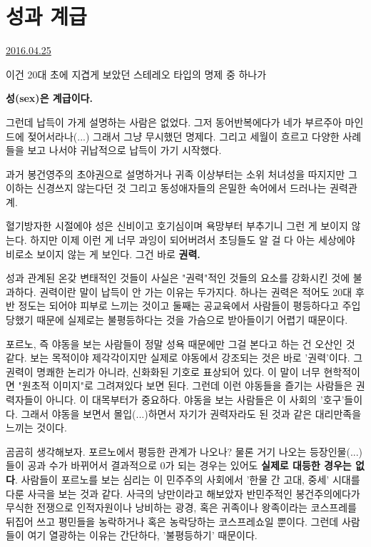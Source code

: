 \section{성과 계급}
\href{https://www.kockoc.com/Apoc/746405}{2016.04.25}

\vspace{5mm}

이건 20대 초에 지겹게 보았던 스테레오 타입의 명제 중 하나가
\vspace{5mm}

\textbf{성(sex)은 계급이다.}
\vspace{5mm}

그런데 납득이 가게 설명하는 사람은 없었다. 그저 동어반복에다가 네가 부르주아 마인드에 젖어서라나(...) 그래서 그냥 무시했던 명제다.
그리고 세월이 흐르고 다양한 사례들을 보고 나서야 귀납적으로 납득이 가기 시작했다.
\vspace{5mm}

과거 봉건영주의 초야권으로 설명하거나
귀족 이상부터는 소위 처녀성을 따지지만 그 이하는 신경쓰지 않는다던 것
그리고 동성애자들의 은밀한 속어에서 드러나는 권력관계.
\vspace{5mm}

혈기방자한 시절에야 성은 신비이고 호기심이며 욕망부터 부추기니 그런 게 보이지 않는다.
하지만 이제 이런 게 너무 과잉이 되어버려서 초딩들도 알 걸 다 아는 세상에야 비로소 보이지 않는 게 보인다.
그건 바로 \textbf{권력.}
\vspace{5mm}

성과 관계된 온갖 변태적인 것들이 사실은 "권력"적인 것들의 요소를 강화시킨 것에 불과하다.
권력이란 말이 납득이 안 가는 이유는 두가지다.
하나는 권력은 적어도 20대 후반 정도는 되어야 피부로 느끼는 것이고
둘째는 공교육에서 사람들이 평등하다고 주입당했기 때문에 실제로는 불평등하다는 것을 가슴으로 받아들이기 어렵기 때문이다.
\vspace{5mm}

포르노, 즉 야동을 보는 사람들이 정말 성욕 때문에만 그걸 본다고 하는 건 오산인 것 같다.
보는 목적이야 제각각이지만 실제로 야동에서 강조되는 것은 바로 '권력'이다.
그 권력이 명쾌한 논리가 아니라, 신화화된 기호로 표상되어 있다. 이 말이 너무 현학적이면 "원초적 이미지"로 그려져있다 보면 된다.
그런데 이런 야동들을 즐기는 사람들은 권력자들이 아니다.
이 대목부터가 중요하다. 야동을 보는 사람들은 이 사회의 '호구'들이다.
그래서 야동을 보면서 몰입(...)하면서 자기가 권력자라도 된 것과 같은 대리만족을 느끼는 것이다.
\vspace{5mm}

곰곰히 생각해보자. 포르노에서 평등한 관계가 나오나?
물론 거기 나오는 등장인물(...)들이 공과 수가 바뀌어서 결과적으로 0가 되는 경우는 있어도 \textbf{실제로 대등한 경우는 없다}.
사람들이 포르노를 보는 심리는 이 민주주의 사회에서 '한물 간 고대, 중세' 시대를 다룬 사극을 보는 것과 같다.
사극의 낭만이라고 해보았자 반민주적인 봉건주의에다가 무식한 전쟁으로 인적자원이나 낭비하는 광경,
혹은 귀족이나 왕족이라는 코스프레를 뒤집어 쓰고 평민들을 농락하거나 혹은 농락당하는 코스프레쇼일 뿐이다.
그런데 사람들이 여기 열광하는 이유는 간단하다, '불평등하기' 때문이다.
\vspace{5mm}

